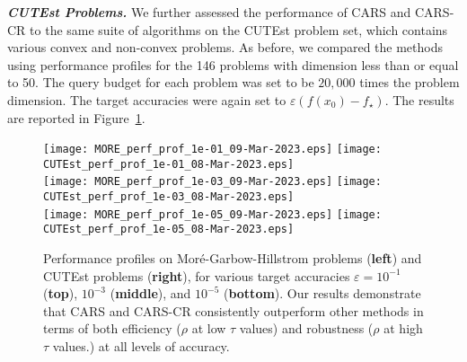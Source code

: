 \vspace{0.1in}
\noindent\textit{\textbf{CUTEst Problems.}}\quad
We further assessed the performance of CARS and CARS-CR to the same suite of algorithms on the CUTEst \cite{gould2015cutest} problem set, which contains various convex and non-convex problems.
As before, we compared the methods using performance profiles for the 146 problems with dimension less than or equal to 50. The query budget for each problem was set to be $20,000$ times the problem dimension. The target accuracies were again set to $\varepsilon (f(x_0) - f_\star)$. The results are reported in Figure~\ref{fig:More Garbow Hillstrom and CUTEst}.


\begin{figure}
    \centering
    \texttt{[image: MORE\_perf\_prof\_1e-01\_09-Mar-2023.eps]}\qquad
    \texttt{[image: CUTEst\_perf\_prof\_1e-01\_08-Mar-2023.eps]} \\
    \texttt{[image: MORE\_perf\_prof\_1e-03\_09-Mar-2023.eps]}\qquad
    \texttt{[image: CUTEst\_perf\_prof\_1e-03\_08-Mar-2023.eps]} \\
    \texttt{[image: MORE\_perf\_prof\_1e-05\_09-Mar-2023.eps]}\qquad
    \texttt{[image: CUTEst\_perf\_prof\_1e-05\_08-Mar-2023.eps]}
    \\
    \vspace{5mm}
    {
        \setlength{\fboxsep}{0pt}
    }\caption{Performance profiles on Mor{\'e}-Garbow-Hillstrom problems (\textbf{left}) and CUTEst problems (\textbf{right}), for various target accuracies $\varepsilon = 10^{-1}$ (\textbf{top}), $10^{-3}$ (\textbf{middle}), and $10^{-5}$ (\textbf{bottom}). Our results demonstrate that CARS and CARS-CR consistently outperform other methods in terms of both efficiency ($\rho$ at low $\tau$ values) and robustness ($\rho$ at high $\tau$ values.) at all levels of accuracy.}\label{fig:More Garbow Hillstrom and CUTEst}
\end{figure}

